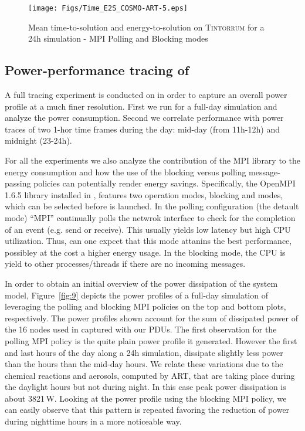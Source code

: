 \begin{figure}[htbf]
  \texttt{[image: Figs/Time\_E2S\_COSMO-ART-5.eps]}
  \caption{Mean time-to-solution and energy-to-solution on
    \textsc{Tintorrum} for a 24h simulation - MPI Polling and Blocking
    modes}
  \label{fig:4}
\end{figure}

\subsection{Power-performance tracing of \cosmoart}
\label{subsec:4.3}

A full tracing experiment is conducted on \tinto in order to capture an overall power
profile at a much finer resolution. First we run \cosmoart for a full-day simulation
and analyze the power consumption. Second we correlate performance with
power traces of two 1-hor time frames during the day: mid-day (from 11h-12h) and
midnight (23-24h).

For all the experiments we also analyze the contribution of the MPI library to the energy consumption and how the use of the blocking versus polling message-passing policies can potentially render energy savings. Specifically, the OpenMPI 1.6.5 library installed in \tinto, features two operation modes, blocking and modes, which can be selected before \cosmoart is launched. In the polling configuration (the detault mode) ``MPI'' continually polls
the netwrok interface to check for the completion of an event (e.g. send or receive).
This usually yields low latency but high CPU utilization. Thus, can one expcet that this mode attanins the best performance, possibley at the cost a higher energy usage. In the blocking
mode, the CPU is yield to other processes/threads if there are no incoming messages.

In order to obtain an initial overview of the power dissipation of the system model, Figure~\ref{fig:9} depicts the power profiles of a full-day simulation of \cosmoart leveraging the  polling and blocking MPI policies on the top and bottom plots, respectively. The power profiles shown account for the sum of dissipated power of the 16 nodes used in \tinto captured with our PDUs. The first observation for the polling MPI policy is the quite plain power profile it generated. However the first and last hours of the day along a 24h simulation, dissipate slightly less power than the hours than the mid-day hours. We relate these variations due to the chemical reactions and aerosols, computed by ART, that are taking place during the daylight hours but not during night. In this case peak power dissipation is about 3821\,W.
Looking at the power profile using the blocking MPI policy, we can easily observe
that this pattern is repeated favoring the reduction of power during nighttime hours in a more noticeable way. 


